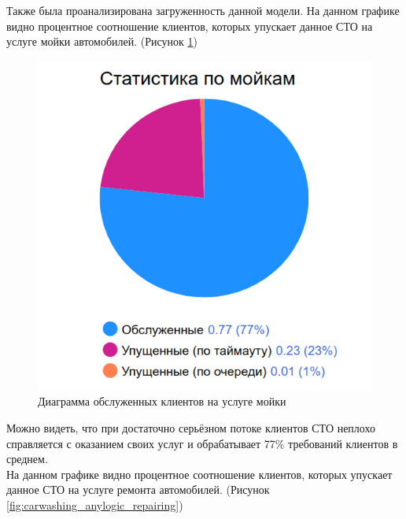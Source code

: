 \documentclass[14pt,fleqn]{extarticle}
\begin{document}
	Также была проанализирована загруженность данной модели. На данном графике видно процентное соотношение клиентов, которых упускает данное СТО на услуге мойки автомобилей. (Рисунок \ref{fig:carwashing_anylogic_washing})
	
	\begin{figure}[h]
		\centering \includegraphics[scale=0.35]{carwashing_anylogic_washing}
		\caption{Диаграмма обслуженных клиентов на услуге мойки}
		\label{fig:carwashing_anylogic_washing}
	\end{figure}

	\newpage
	
	Можно видеть, что при достаточно серьёзном потоке клиентов СТО неплохо справляется с оказанием своих услуг и обрабатывает 77\% требований клиентов в среднем.\\
	
	На данном графике видно процентное соотношение клиентов, которых упускает данное СТО на услуге ремонта автомобилей. (Рисунок \ref{fig:carwashing_anylogic_repairing})
	
\end{document}
